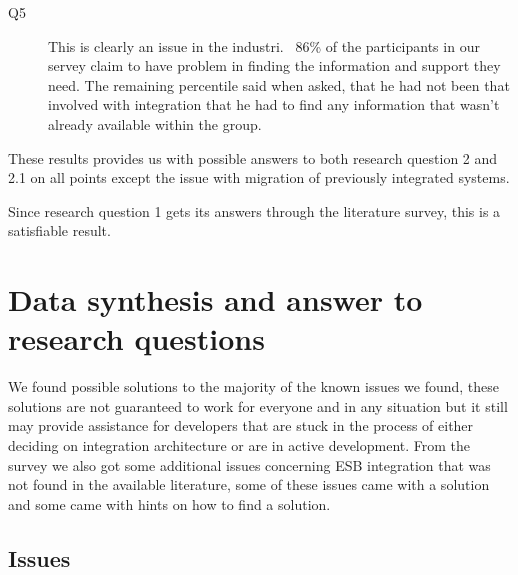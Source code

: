 \documentclass{llncs}
\begin{document}
\begin{description}
\item[Q5] This is clearly an issue in the industri. ~86\% of the participants in our servey claim to have problem in finding the information and support they need. The remaining percentile said when asked, that he had not been that involved with integration that he had to find any information that wasn't already available within the group.
\end{description}

These results provides us with possible answers to both research question 2 and 2.1 on all points except the issue with migration of previously integrated systems.

Since research question 1 gets its answers through the literature survey, this is a satisfiable result.

\section{Data synthesis and answer to research questions}
We found possible solutions to the majority of the known issues we found, these solutions are not guaranteed to work for everyone and in any situation but it still may provide assistance for developers that are stuck in the process of either deciding on integration architecture or are in active development.
From the survey we also got some additional issues concerning ESB integration that was not found in the available literature, some of these issues came with a solution and some came with hints on how to find a solution.

\subsection{Issues}
\end{document}
